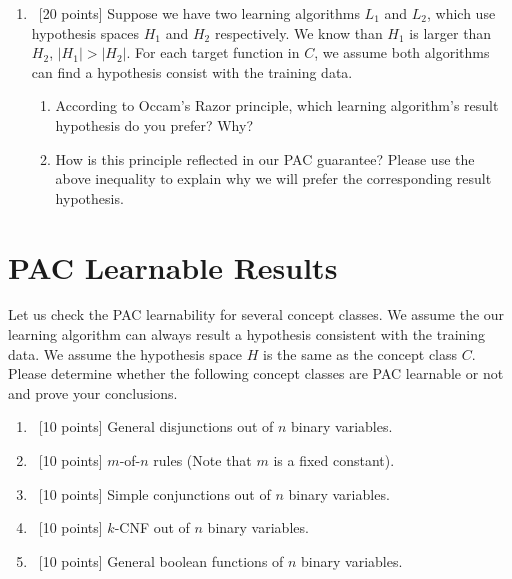 \documentclass[12pt, fullpage,letterpaper]{article}
\begin{document}
\begin{enumerate}
\item~[20 points] Suppose we have two learning algorithms $L_1$ and $L_2$, which use hypothesis spaces $H_1$ and $H_2$ respectively. We know than $H_1$ is larger than $H_2$, \ie $|H_1| > |H_2|$.
 For each target function in $C$, we assume both algorithms can find a hypothesis consist with the training data. 
 \begin{enumerate}
 \item According to Occam's Razor principle, which learning algorithm's  result hypothesis do you prefer? Why?
 \item How is this principle reflected in our PAC guarantee? Please use the above inequality to explain why we will prefer the corresponding result hypothesis. 
 \end{enumerate}
\end{enumerate}

\section{PAC Learnable Results}
Let us check the PAC learnability for several concept classes. We assume the our learning algorithm can always result a hypothesis consistent with the training data. We assume the hypothesis space $H$ is the same as the concept class $C$. Please determine whether the following concept classes are PAC learnable or not and prove your conclusions. 
\begin{enumerate}
\item~[10 points] General disjunctions out of $n$ binary variables.  
\item~[10 points] $m$-of-$n$ rules (Note that $m$ is a fixed constant).  
\item~[10 points] Simple conjunctions out of $n$ binary variables. 
\item~[10 points] $k$-CNF out of $n$ binary variables. 
\item~[10 points] General boolean functions of $n$ binary variables. 
\end{enumerate}
\end{document}
